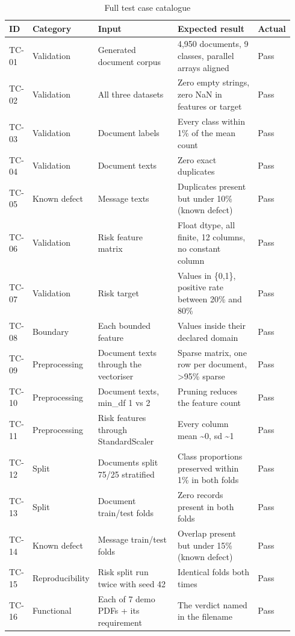 \documentclass[11pt,a4paper]{article}
\begin{document}
\begin{table}[!t]
\centering
\caption{Full test case catalogue}
\small
\setlength{\tabcolsep}{3pt}
\begin{tabular}{p{0.073\linewidth}p{0.136\linewidth}p{0.313\linewidth}p{0.345\linewidth}p{0.073\linewidth}}
\toprule
\textbf{ID} & \textbf{Category} & \textbf{Input} & \textbf{Expected result} & \textbf{Actual} \\
\midrule
TC-01 & Validation & Generated document corpus & 4,950 documents, 9 classes, parallel arrays aligned & Pass \\
TC-02 & Validation & All three datasets & Zero empty strings, zero NaN in features or target & Pass \\
TC-03 & Validation & Document labels & Every class within 1\% of the mean count & Pass \\
TC-04 & Validation & Document texts & Zero exact duplicates & Pass \\
TC-05 & Known defect & Message texts & Duplicates present but under 10\% (known defect) & Pass \\
TC-06 & Validation & Risk feature matrix & Float dtype, all finite, 12 columns, no constant column & Pass \\
TC-07 & Validation & Risk target & Values in \{0,1\}, positive rate between 20\% and 80\% & Pass \\
TC-08 & Boundary & Each bounded feature & Values inside their declared domain & Pass \\
TC-09 & Preprocessing & Document texts through the vectoriser & Sparse matrix, one row per document, >95\% sparse & Pass \\
TC-10 & Preprocessing & Document texts, min\_df 1 vs 2 & Pruning reduces the feature count & Pass \\
TC-11 & Preprocessing & Risk features through StandardScaler & Every column mean \textasciitilde{}0, sd \textasciitilde{}1 & Pass \\
TC-12 & Split & Documents split 75/25 stratified & Class proportions preserved within 1\% in both folds & Pass \\
TC-13 & Split & Document train/test folds & Zero records present in both folds & Pass \\
TC-14 & Known defect & Message train/test folds & Overlap present but under 15\% (known defect) & Pass \\
TC-15 & Reproducibility & Risk split run twice with seed 42 & Identical folds both times & Pass \\
TC-16 & Functional & Each of 7 demo PDFs + its requirement & The verdict named in the filename & Pass \\

\end{tabular}
\end{table}
\end{document}
